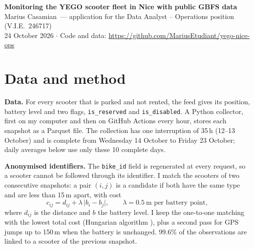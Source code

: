 \documentclass[11pt,a4paper]{article}
\newcommand{\myname}{Marius Casamian}
\begin{document}
\begin{center}
  {\Large\bfseries Monitoring the YEGO scooter fleet in Nice with public GBFS data}\\[4pt]
  \myname\ --- application for the Data Analyst -- Operations position (V.I.E.\ 246717)\\
  24 October 2026 \quad $\cdot$ \quad Code and data: \url{https://github.com/MariusEtudiant/yego-nice-ops}
\end{center}

\begin{abstract}
\noindent YEGO publishes the position and battery level of its scooters in real time through the
General Bikeshare Feed Specification (GBFS). I collected this feed every two minutes in Nice and
Barcelona from Sunday 11 October at 18:23 to Saturday 24 October at 10:47 (8,308 snapshots for Nice, including 10
complete days) and computed operational indicators with dbt. Three findings stand out for Nice:
(i) on 9 of the 10 evenings observed, most battery swaps came after the demand peak,
while about 27 scooters were waiting for a battery at that peak; (ii) a scooter disabled
for low battery waits 5.3\,h (median) before its swap, about twice as long as in Barcelona;
(iii) 12.6\% of the fleet is disabled for reasons other than battery, often for days.
\end{abstract}

\section{Data and method}

\textbf{Data.} For every scooter that is parked and not rented, the feed \cite{gbfs} gives its
position, battery level and two flags, \texttt{is\_reserved} and \texttt{is\_disabled}. A Python
collector, first on my computer and then on GitHub Actions every hour, stores each snapshot as a
Parquet file. The collection has one interruption of 35\,h (12--13 October) and is complete
from Wednesday 14 October to Friday 23 October; daily averages below use only these 10 complete days.

\textbf{Anonymised identifiers.} The \texttt{bike\_id} field is regenerated at every request, so a
scooter cannot be followed through its identifier. I match the scooters of two consecutive snapshots:
a pair $(i,j)$ is a candidate if both have the same type and are less than 15\,m apart, with cost
\begin{equation}
  c_{ij} = d_{ij} + \lambda\,\lvert b_i - b_j \rvert, \qquad \lambda = 0.5\ \text{m per battery point},
\end{equation}
where $d_{ij}$ is the distance and $b$ the battery level. I keep the one-to-one matching with the
lowest total cost (Hungarian algorithm \cite{kuhn1955}), plus a second pass for GPS jumps up to
150\,m when the battery is unchanged. 99.6\% of the observations are linked to a scooter of
the previous snapshot.
\end{document}
